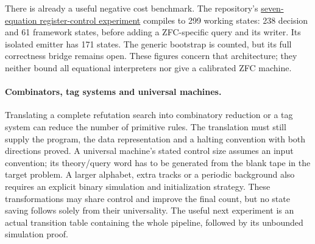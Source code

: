 There is already a useful negative cost benchmark. The repository's
\href{https://github.com/VladimirReshetnikov/ProveIt/blob/13ec39ed43148b1807f51ed6e6528e1c84659562/Computability/BusyBeaver/Research/ZFC/equational_generator_cost.md}{seven-equation register-control experiment}
compiles to 299 working states: 238 decision and 61 framework states,
before adding a ZFC-specific query and its writer. Its isolated emitter
has 171 states. The generic bootstrap is counted, but its full correctness
bridge remains open. These figures concern that architecture; they neither
bound all equational interpreters nor give a calibrated ZFC machine.

\paragraph{Combinators, tag systems and universal machines.}
Translating a complete refutation search into combinatory reduction or a
tag system can reduce the number of primitive rules. The translation must
still supply the program, the data representation and a halting convention
with both directions proved. A universal machine's stated control size
assumes an input convention; its theory/query word has to be generated from
the blank tape in the target problem. A larger alphabet, extra tracks or
a periodic background also requires an explicit binary simulation and
initialization strategy. These transformations may share control and
improve the final count, but no state saving follows solely from their
universality. The useful next experiment is an actual transition table
containing the whole pipeline, followed by its unbounded simulation proof.
